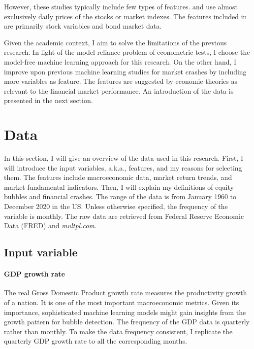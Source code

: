 \documentclass[12pt, man, a4paper, floatsintext]{apa7}
\begin{document}
However, these studies typically include few types of features. \textcite{Bash2020} and \textcite{Moser} use almost exclusively daily prices of the stocks or market indexes. The features included in \textcite{Chat2018} are primarily stock variables and bond market data. 

Given the academic context, I aim to solve the limitations of the previous research. In light of the model-reliance problem of econometric tests, I choose the model-free machine learning approach for this research. On the other hand, I improve upon previous machine learning studies for market crashes by including more variables as feature. The features are suggested by economic theories as relevant to the financial market performance. An introduction of the data is presented in the next section.

    \section{Data}

In this section, I will give an overview of the data used in this research. First, I will introduce the input variables, a.k.a., features, and my reasons for selecting them. The features include macroeconomic data, market return trends, and market fundamental indicators. Then, I will explain my definitions of equity bubbles and financial crashes. The range of the data is from January 1960 to December 2020 in the US. Unless otherwise specified, the frequency of the variable is monthly. The raw data are retrieved from Federal Reserve Economic Data (FRED) and \emph{multpl.com}.

\subsection{Input variable}

\paragraph{GDP growth rate} The real Gross Domestic Product growth rate measures the productivity growth of a nation. It is one of the most important macroeconomic metrics. Given its importance, sophisticated machine learning models might gain insights from the growth pattern for bubble detection. The frequency of the GDP data is quarterly rather than monthly. To make the data frequency consistent, I replicate the quarterly GDP growth rate to all the corresponding months.
\end{document}
